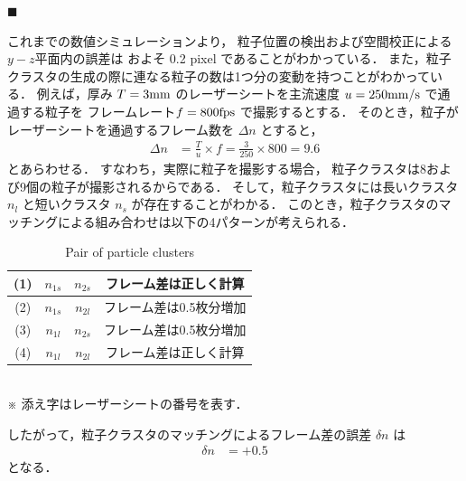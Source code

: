 \documentclass[twocolumn,a4j]{jsarticle}
\begin{document}
$\blacksquare$ 

これまでの数値シミュレーションより，
粒子位置の検出および空間校正による$y-z$平面内の誤差は
およそ 0.2 pixel であることがわかっている．
また，粒子クラスタの生成の際に連なる粒子の数は1つ分の変動を持つことがわかっている．
例えば，厚み $T=3 \rm{mm}$ のレーザーシートを主流速度 $u=250 \rm{mm/s}$ で通過する粒子を
フレームレート$f=800 \rm{fps}$ で撮影するとする．
そのとき，粒子がレーザーシートを通過するフレーム数を $\Delta n$ とすると，
\begin{align*}
  \Delta n & = \frac{T}{u} \times f = \frac{3}{250} \times 800 = 9.6
\end{align*}
とあらわせる．
すなわち，実際に粒子を撮影する場合，
粒子クラスタは8および9個の粒子が撮影されるからである．
そして，粒子クラスタには長いクラスタ $n_l$ と短いクラスタ $n_s$ が存在することがわかる．
このとき，粒子クラスタのマッチングによる組み合わせは以下の4パターンが考えられる．

\begin{table}[hbtp]
  \centering
  \caption{Pair of particle clusters}
  \begin{tabular}{c c c c}
    \hline
    (1) & $n_{1s}$ & $n_{2s}$ & フレーム差は正しく計算  \\ \hline
    (2) & $n_{1s}$ & $n_{2l}$ & フレーム差は0.5枚分増加 \\ \hline
    (3) & $n_{1l}$ & $n_{2s}$ & フレーム差は0.5枚分増加 \\ \hline
    (4) & $n_{1l}$ & $n_{2l}$ & フレーム差は正しく計算  \\ \hline
  \end{tabular}\\
   \baselineskip
  ※ 添え字はレーザーシートの番号を表す．
\end{table}

したがって，粒子クラスタのマッチングによるフレーム差の誤差 $\delta n$ は
\begin{align*}
  \delta n & = +0.5
\end{align*}
となる．
\end{document}

